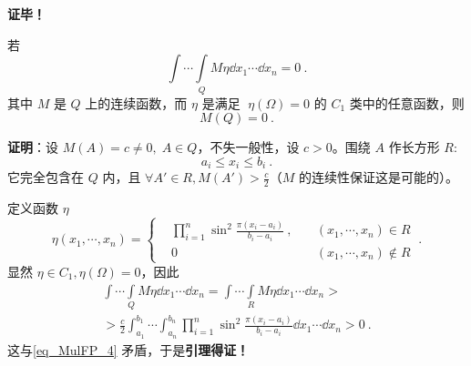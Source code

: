 \textbf{证毕！}

\begin{lemma}{}
若
\begin{equation}\label{eq_MulFP_4}
\int\cdots\int\limits_Q M\eta\dd x_1\cdots\dd x_n=0~.
\end{equation}
其中 $M$ 是 $Q$ 上的连续函数，而 $\eta$ 是满足 $\;\eta(\Omega)=0$  的 $C_1$ 类中的任意函数，则
\begin{equation}
M(Q)=0~.
\end{equation}
\end{lemma}
  \textbf{证明}：设 $M(A)=c\neq0,\;A\in Q$，不失一般性，设 $c>0$。围绕 $A$ 作长方形 $R$:
  \begin{equation}
  a_i\leq x_i\leq b_i~.
  \end{equation}
  它完全包含在 $Q$ 内，且 $\forall A'\in R,M(A')>\frac{c}{2}$（$M$ 的连续性保证这是可能的）。

  定义函数 $\eta$
  \begin{equation}
  \eta(x_1,\cdots,x_n)=\left\{
      \begin{aligned}
      &\prod_{i=1}^n \sin^2\frac{\pi(x_i-a_i)}{b_i-a_i}~,\quad &(x_1,\cdots,x_n)\in R\\
      &0\quad &(x_1,\cdots,x_n)\notin R
      \end{aligned}~.\right.
  \end{equation}
  显然 $\eta\in C_1,\eta(\Omega)=0$，因此
  \begin{equation}
  \begin{aligned}
  \int\cdots\int\limits_Q M\eta\dd x_1\cdots\dd x_n=\int\cdots\int\limits_R M\eta\dd x_1\cdots\dd x_n>\\
  >\frac{c}{2}\int_{a_1}^{b_1}\cdots\int_{a_n}^{b_n}\prod_{i=1}^n \sin^2\frac{\pi(x_i-a_i)}{b_i-a_i}\dd x_1\cdots\dd x_n>0~.
  \end{aligned}
  \end{equation}
  这与\autoref{eq_MulFP_4} 矛盾，于是\textbf{引理得证！}